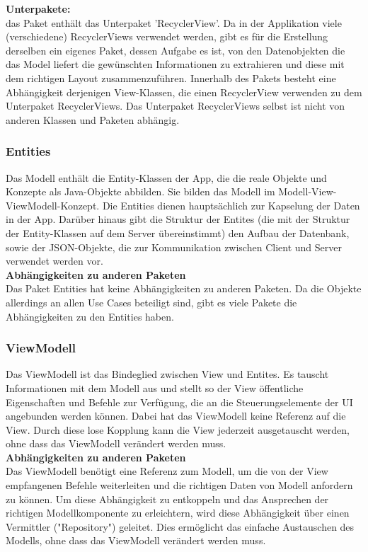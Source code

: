 \documentclass[11pt,a4paper]{article}
\begin{document}
\textbf{Unterpakete:}\\
das Paket enthält das Unterpaket 'RecyclerView'. Da in der Applikation viele (verschiedene) RecyclerViews verwendet werden, gibt es für die Erstellung derselben ein eigenes Paket, dessen Aufgabe es ist, von den Datenobjekten die das Model liefert die gewünschten Informationen zu extrahieren und diese mit dem richtigen Layout zusammenzuführen. Innerhalb des Pakets besteht eine Abhängigkeit derjenigen View-Klassen, die einen RecyclerView verwenden zu dem Unterpaket RecyclerViews. Das Unterpaket RecyclerViews selbst ist nicht von anderen Klassen und Paketen abhängig.\\

\subsubsection{Entities}
Das Modell enthält die Entity-Klassen der App, die die reale Objekte und Konzepte als Java-Objekte abbilden. Sie bilden das Modell im Modell-View-ViewModell-Konzept. Die Entities dienen hauptsächlich zur Kapselung der Daten in der App. Darüber hinaus gibt die Struktur der Entites (die mit der Struktur der Entity-Klassen auf dem Server übereinstimmt) den Aufbau der Datenbank, sowie der JSON-Objekte, die zur Kommunikation zwischen Client und Server verwendet werden vor.\\

\textbf{Abhängigkeiten zu anderen Paketen}\\
Das Paket Entities hat keine Abhängigkeiten zu anderen Paketen. Da die Objekte allerdings an allen Use Cases beteiligt sind, gibt es viele Pakete die Abhängigkeiten zu den Entities haben.\\

\subsubsection{ViewModell}
Das ViewModell ist das Bindeglied zwischen View und Entites. Es tauscht Informationen mit dem Modell aus und stellt so der View öffentliche Eigenschaften und Befehle zur Verfügung, die an die Steuerungselemente der UI angebunden werden können. Dabei hat das ViewModell keine Referenz auf die View. Durch diese lose Kopplung kann die View jederzeit ausgetauscht werden, ohne dass das ViewModell verändert werden muss.\\

\textbf{Abhängigkeiten zu anderen Paketen}\\
Das ViewModell benötigt eine Referenz zum Modell, um die von der View empfangenen Befehle weiterleiten und die richtigen Daten von Modell anfordern zu können. Um diese Abhängigkeit zu entkoppeln und das Ansprechen der richtigen Modellkomponente zu erleichtern, wird diese Abhängigkeit über einen Vermittler ("Repository") geleitet. Dies ermöglicht das einfache Austauschen des Modells, ohne dass das ViewModell verändert werden muss.\\
\end{document}

